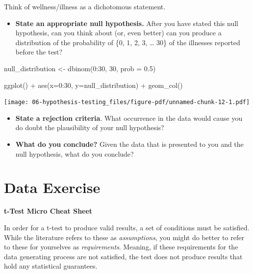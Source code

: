 \documentclass[
  letterpaper,
  DIV=11,
  numbers=noendperiod]{scrreprt}
\newenvironment{Shaded}{\begin{snugshade}}{\end{snugshade}}
\newcommand{\AttributeTok}[1]{\textcolor[rgb]{0.40,0.45,0.13}{#1}}
\newcommand{\DecValTok}[1]{\textcolor[rgb]{0.68,0.00,0.00}{#1}}
\newcommand{\FloatTok}[1]{\textcolor[rgb]{0.68,0.00,0.00}{#1}}
\newcommand{\FunctionTok}[1]{\textcolor[rgb]{0.28,0.35,0.67}{#1}}
\newcommand{\NormalTok}[1]{\textcolor[rgb]{0.00,0.23,0.31}{#1}}
\newcommand{\OtherTok}[1]{\textcolor[rgb]{0.00,0.23,0.31}{#1}}
\newcommand{\SpecialCharTok}[1]{\textcolor[rgb]{0.37,0.37,0.37}{#1}}
\providecommand{\tightlist}{%
  \setlength{\itemsep}{0pt}\setlength{\parskip}{0pt}}\usepackage{longtable,booktabs,array}
\begin{document}
Think of wellness/illness as a dichotomous statement.

\begin{itemize}
\tightlist
\item
  \textbf{State an appropriate null hypothesis.} After you have stated
  this null hypothesis, can you think about (or, even better) can you
  produce a distribution of the probability of \{0, 1, 2, 3, \ldots{}
  30\} of the illnesses reported before the test?
\end{itemize}

\begin{Shaded}
\begin{Highlighting}[]
\NormalTok{null\_distribution }\OtherTok{\textless{}{-}} \FunctionTok{dbinom}\NormalTok{(}\DecValTok{0}\SpecialCharTok{:}\DecValTok{30}\NormalTok{, }\DecValTok{30}\NormalTok{, }\AttributeTok{prob =} \FloatTok{0.5}\NormalTok{)}

\FunctionTok{ggplot}\NormalTok{() }\SpecialCharTok{+} 
  \FunctionTok{aes}\NormalTok{(}\AttributeTok{x=}\DecValTok{0}\SpecialCharTok{:}\DecValTok{30}\NormalTok{, }\AttributeTok{y=}\NormalTok{null\_distribution) }\SpecialCharTok{+} 
  \FunctionTok{geom\_col}\NormalTok{()}
\end{Highlighting}
\end{Shaded}

\texttt{[image: 06-hypothesis-testing\_files/figure-pdf/unnamed-chunk-12-1.pdf]}

\begin{itemize}
\item
  \textbf{State a rejection criteria}. What occurrence in the data would
  cause you do doubt the plausibility of your null hypothesis?
\item
  \textbf{What do you conclude?} Given the data that is presented to you
  and the null hypothesis, what do you conclude?
\end{itemize}

\section{Data Exercise}\label{data-exercise}

\textbf{t-Test Micro Cheat Sheet}

In order for a t-test to produce valid results, a set of conditions must
be satisfied. While the literature refers to these as
\emph{assumptions}, you might do better to refer to these for yourselves
as \emph{requirements}. Meaning, if these requirements for the data
generating process are not satisfied, the test does not produce results
that hold any statistical guarantees.
\end{document}
